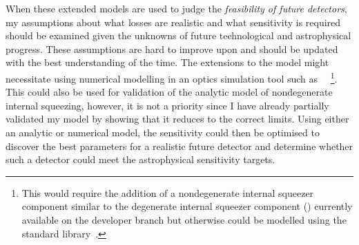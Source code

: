 When these extended models are used to judge the \emph{feasibility of future detectors}, my assumptions about what losses are realistic and what sensitivity is required should be examined given the unknowns of future technological and astrophysical progress. These assumptions are hard to improve upon and should be updated with the best understanding of the time.
The extensions to the model might necessitate using numerical modelling in an optics simulation tool such as ~\cite{finesse}~\footnote{This would require the addition of a nondegenerate internal squeezer component similar to the degenerate internal squeezer component () currently available on the  developer branch but otherwise could be modelled using the standard library~\cite{BROWN_PYKAT}.}. This could also be used for validation of the analytic model of nondegenerate internal squeezing, however, it is not a priority since I have already partially validated my model by showing that it reduces to the correct limits. %
Using either an analytic or numerical model, the sensitivity could then be optimised to discover the best parameters for a realistic future detector and determine whether such a detector could meet the astrophysical sensitivity targets. %


